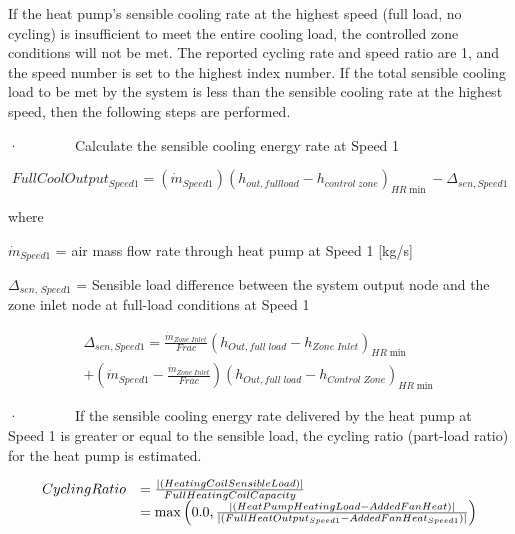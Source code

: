 If the heat pump's sensible cooling rate at the highest speed (full load, no cycling) is insufficient to meet the entire cooling load, the controlled zone conditions will not be met. The reported cycling rate and speed ratio are 1, and the speed number is set to the highest index number. If the total sensible cooling load to be met by the system is less than the sensible cooling rate at the highest speed, then the following steps are performed.

·~~~~~~~~Calculate the sensible cooling energy rate at Speed 1

\begin{equation}
FullCoolOutpu{t_{Speed1}} = \left( {{{\dot m}_{Speed1}}} \right){\left( {{h_{out,fullload}} - {h_{control\;zone}}} \right)_{HR\min }} - {\Delta_{sen,Speed1}}
\end{equation}

where

\emph{\({{{\dot m}_{Speed1}}}\)} = air mass flow rate through heat pump at Speed 1 {[}kg/s{]}

\(\Delta_{sen,\, Speed1}\) = Sensible load difference between the system output node and the zone inlet node at full-load conditions at Speed 1

\begin{equation}
\begin{split}
{\Delta_{sen,Speed1}} = \frac{{{{\dot m}_{Zone\;Inlet}}}}{{Frac}}{\left( {{h_{Out,full\;load}} - {h_{Zone\;Inlet}}} \right)_{HR\min }} \\
+ \left( {{{\dot m}_{Speed1}} - \frac{{{{\dot m}_{Zone\;Inlet}}}}{{Frac}}} \right){\left( {{h_{Out,full\;load}} - {h_{Control\;Zone}}} \right)_{HR\min }}
\end{split}
\end{equation}

·~~~~~~~~If the sensible cooling energy rate delivered by the heat pump at Speed 1 is greater or equal to the sensible load, the cycling ratio (part-load ratio) for the heat pump is estimated.

\begin{equation}
  \begin{array}{rl}
    CyclingRatio &= \frac{\left|\left(HeatingCoilSensibleLoad\right)\right|}{FullHeatingCoilCapacity} \\
                 &= \max \left(0.0, \frac{\left|\left(HeatPumpHeatingLoad-AddedFanHeat\right)\right|}{\left|\left(FullHeatOutput_{Speed1}-AddedFanHeat_{Speed1}\right)\right|} \right)
  \end{array}
\end{equation}

